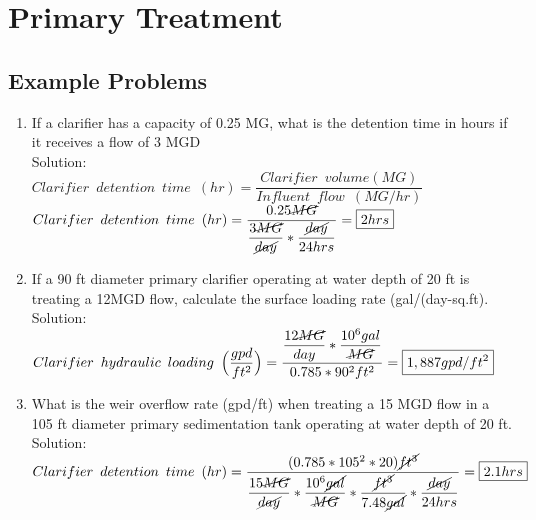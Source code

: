 \documentclass{article}
\begin{document}
\section{Primary Treatment} 
\subsection{Example Problems} 
\begin{enumerate}
\item If a clarifier has a capacity of 0.25 MG, what is the detention time in hours if it receives a flow of 3 MGD\\
Solution:\\
$Clarifier \enspace detention \enspace time \enspace (hr) = 	\dfrac{ Clarifier \enspace volume (MG)}{Influent \enspace flow \enspace (MG/hr)}$\\
\vspace{0.5cm}
$Clarifier \enspace detention \enspace time \enspace (hr) = 	\dfrac{0.25\cancel{MG}}{\dfrac{3\cancel{MG}}{\cancel{day}}*\dfrac{\cancel{day}}{24hrs}}=\boxed{2hrs}$\\

\item If a 90 ft diameter primary clarifier operating at water depth of 20 ft is treating a 12MGD flow, calculate the surface loading rate (gal/(day-sq.ft).\\
Solution:\\
$Clarifier \enspace hydraulic \enspace loading \enspace 	\Big(\dfrac{gpd}{ft^2}\Big) =\dfrac{\dfrac{12\cancel{MG}}{{day}}*\dfrac{10^6gal}{\cancel{MG}}}{0.785*90^2 ft^2}=\boxed{1,887gpd/ft^2}$\\


\vspace{0.5cm}
\item What is the weir overflow rate (gpd/ft) when treating a 15 MGD flow in a 105 ft diameter primary sedimentation tank operating at water depth of 20 ft.\\
\vspace{0.5cm}
Solution:\\
\vspace{0.5cm}
$Clarifier \enspace detention \enspace time \enspace (hr) = 	\dfrac{(0.785*105^2*20)\cancel{ft^3}}{\dfrac{15\cancel{MG}}{\cancel{day}}*\dfrac{10^6\cancel{gal}}{\cancel{MG}}*\dfrac{\cancel{ft^3}}{7.48\cancel{gal}}*\dfrac{\cancel{day}}{24hrs}}=\boxed{2.1hrs}$\\
\end{enumerate}
\end{document}
